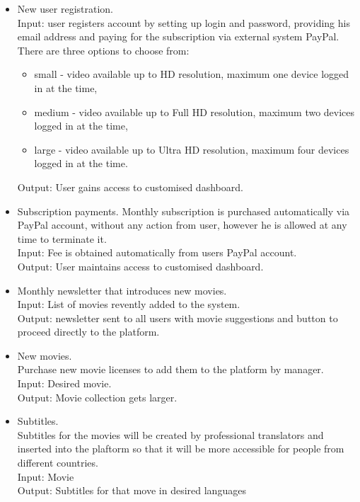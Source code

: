 \documentclass{scrreprt}
\begin{document}
\begin{itemize}
\item New user registration.
\\Input: user registers account by setting up login and password, providing his email address and paying for the subscription via external system PayPal. There are three options to choose from:
\begin{itemize}
\item small - video available up to HD resolution, maximum one device logged in at the time,
\item medium - video available up to Full HD resolution, maximum two devices logged in at the time,
\item large - video available up to Ultra HD resolution, maximum four devices logged in at the time.
\end{itemize}
Output: User gains access to customised dashboard.

\item Subscription payments.
Monthly subscription is purchased automatically via PayPal account, without any action from user, however he is allowed at any time to terminate it.
\\Input: Fee is obtained automatically from users PayPal account.
\\Output: User maintains access to customised dashboard.

\item Monthly newsletter that introduces new movies.
\\Input: List of movies revently added to the system.
\\Output: newsletter sent to all users with movie suggestions and button to proceed directly to the platform.

\item New movies.
\\Purchase new movie licenses to add them to the platform by manager.
\\Input: Desired movie.
\\Output: Movie collection gets larger.

\item Subtitles.
\\Subtitles for the movies will be created by professional translators and inserted into the plaftorm so that it will be more accessible for people from different countries.
\\Input: Movie
\\Output: Subtitles for that move in desired languages
\end{itemize}
\end{document}
